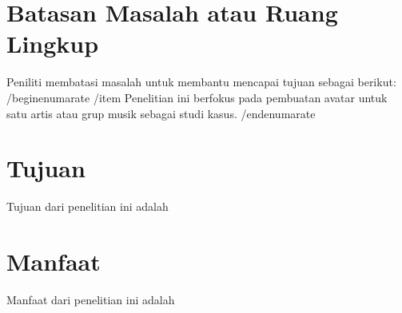 \section{Batasan Masalah atau Ruang Lingkup}

Peniliti membatasi masalah untuk membantu mencapai tujuan sebagai berikut:
/begin{enumarate}
/item Penelitian ini berfokus pada pembuatan avatar untuk satu artis atau grup musik sebagai studi kasus.
/end{enumarate}


\section{Tujuan}

Tujuan dari penelitian ini adalah \lipsum[7][1-14]

\section{Manfaat}

Manfaat dari penelitian ini adalah \lipsum[8][1-14]
